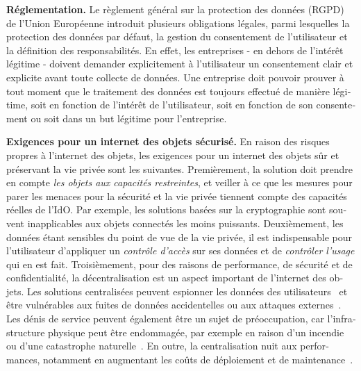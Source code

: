 \begin{otherlanguage}{french}
\textbf{Réglementation.} Le règlement général sur la protection des données (RGPD) de l'Union Européenne \cite{EUdataregulations2018} introduit plusieurs obligations légales, parmi lesquelles la protection des données par défaut, la gestion du consentement de l'utilisateur et la définition des responsabilités. En effet, les entreprises - en dehors de l'intérêt légitime - doivent demander explicitement à l'utilisateur un consentement clair et explicite avant toute collecte de données. Une entreprise doit pouvoir prouver à tout moment que le traitement des données est toujours effectué de manière légitime, soit en fonction de l'intérêt de l'utilisateur, soit en fonction de son consentement ou soit dans un but légitime pour l'entreprise.

\textbf{Exigences pour un internet des objets sécurisé.}
En raison des risques propres à l'internet des objets, les exigences pour un internet des objets sûr et préservant la vie privée sont les suivantes. Premièrement, la solution doit prendre en compte \emph{les objets aux capacités restreintes},
et veiller à ce que les mesures pour parer les menaces pour la sécurité et la vie privée tiennent compte des capacités réelles de l’IdO. Par exemple, les solutions basées sur la cryptographie sont souvent inapplicables aux objets connectés les moins puissants. Deuxièmement, les données étant sensibles du point de vue de la vie privée, il est indispensable pour l'utilisateur d'appliquer un \emph{contrôle d'accès} sur ses données et de \emph{contrôler l'usage} qui en est fait. Troisièmement, pour des raisons de performance, de sécurité et de confidentialité, la décentralisation est un aspect important de l'internet des objets. Les solutions centralisées peuvent espionner les données des utilisateurs~\cite{Qin2020} et être vulnérables aux fuites de données accidentelles ou aux attaques externes~\cite{Qin2020}. Les dénis de service peuvent également être un sujet de préoccupation, car l'infrastructure physique peut être endommagée, par exemple en raison d'un incendie ou d'une catastrophe naturelle~\cite{Ayoub2021}. En outre, la centralisation nuit aux performances, notamment en augmentant les coûts de déploiement et de maintenance~\cite{Salimitari2020}.


\end{otherlanguage}
